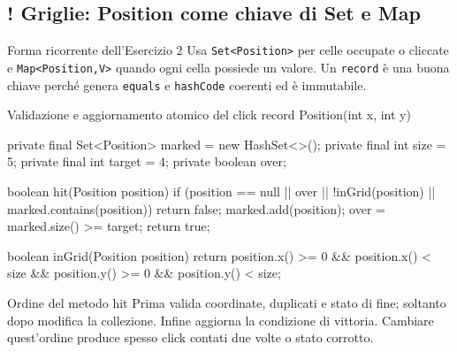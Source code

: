 ﻿\documentclass[10pt,a4paper]{article}
\newcommand{\cmd}[1]{\texttt{#1}}
\DeclareRobustCommand{\exammark}{%
  \texorpdfstring{\textcolor{examred}{\bfseries\Large !}\hspace{.18em}}{! }%
}
\newcommand{\topicsubsection}[1]{\Needspace{10\baselineskip}\subsection{#1}}
\newenvironment{topicblock}{%
  \par\medskip\noindent\begin{minipage}{\textwidth}%
}{%
  \end{minipage}\par\medskip%
}
\begin{document}
\begin{topicblock}
\topicsubsection{\exammark Griglie: Position come chiave di Set e Map}
\begin{concept}{Forma ricorrente dell'Esercizio 2}
Usa \cmd{Set<Position>} per celle occupate o cliccate e
\cmd{Map<Position,V>} quando ogni cella possiede un valore. Un \cmd{record}
è una buona chiave perché genera \cmd{equals} e \cmd{hashCode} coerenti ed è
immutabile.
\end{concept}

\begin{codebox}{Validazione e aggiornamento atomico del click}
record Position(int x, int y) { }

private final Set<Position> marked = new HashSet<>();
private final int size = 5;
private final int target = 4;
private boolean over;

boolean hit(Position position) {
    if (position == null || over
            || !inGrid(position)
            || marked.contains(position)) {
        return false;
    }
    marked.add(position);
    over = marked.size() >= target;
    return true;
}

boolean inGrid(Position position) {
    return position.x() >= 0 && position.x() < size
        && position.y() >= 0 && position.y() < size;
}
\end{codebox}

\begin{examtrap}{Ordine del metodo hit}
Prima valida coordinate, duplicati e stato di fine; soltanto dopo modifica
la collezione. Infine aggiorna la condizione di vittoria. Cambiare
quest'ordine produce spesso click contati due volte o stato corrotto.
\end{examtrap}
\end{topicblock}
\end{document}
